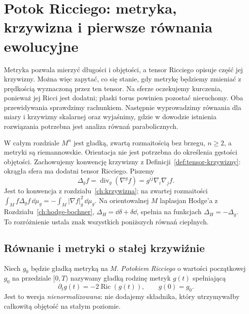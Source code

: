 \chapter{Potok Ricciego: metryka, krzywizna i pierwsze równania ewolucyjne}
\label{ch:potok-ricciego}

Metryka pozwala mierzyć długości i objętości, a tensor Ricciego
opisuje część jej krzywizny. Można więc zapytać, co się stanie,
gdy metrykę będziemy zmieniać z prędkością wyznaczoną przez
ten tensor. Na sferze oczekujemy kurczenia, ponieważ jej Ricci
jest dodatni; płaski torus powinien pozostać nieruchomy.
Oba przewidywania sprawdzimy rachunkiem. Następnie wyprowadzimy
równania dla miary i krzywizny skalarnej oraz wyjaśnimy, gdzie
w dowodzie istnienia rozwiązania potrzebna jest analiza równań
parabolicznych.

W całym rozdziale $M^n$ jest gładką, zwartą rozmaitością bez
brzegu, $n\geq2$, a metryki są riemannowskie. Orientacja nie jest
potrzebna do określenia gęstości objętości. Zachowujemy konwencję
krzywizny z Definicji~\ref{def:tensor-krzywizny}: okrągła sfera
ma dodatni tensor Ricciego. Piszemy
\[
 \Delta_g f=\operatorname{div}_g(\nabla^g f)
            =g^{ij}\nabla_i\nabla_j f.
\]
Jest to konwencja z rozdziału~\ref{ch:krzywizna}; na zwartej
rozmaitości $\int_M f\Delta_g f\,\dd\mu_g
=-\int_M|\nabla f|_g^2\,\dd\mu_g$. Na orientowalnej $M$
laplasjan Hodge'a z Rozdziału~\ref{ch:hodge-bochner},
$\Delta_H=\dd\delta+\delta\dd$, spełnia na funkcjach
$\Delta_H=-\Delta_g$. To rozróżnienie ustala
znak wszystkich poniższych równań cieplnych.

\section{Równanie i metryki o stałej krzywiźnie}
\label{sec:ricci-flow-definition}

\begin{definicja}
\label{def:ricci-flow}
Niech $g_0$ będzie gładką metryką na $M$. \emph{Potokiem
Ricciego} o wartości początkowej $g_0$ na przedziale $[0,T)$
nazywamy gładką rodzinę metryk $g(t)$ spełniającą
\begin{equation}\label{eq:ricci-flow}
 \partial_tg(t)=-2\operatorname{Ric}(g(t)),
 \qquad g(0)=g_0.
\end{equation}
Jest to wersja \emph{nienormalizowana}: nie dodajemy składnika,
który utrzymywałby całkowitą objętość na stałym poziomie.
\end{definicja}


